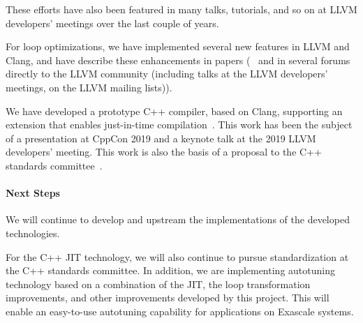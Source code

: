 These efforts have also been featured in many talks, tutorials, and so on at LLVM developers' meetings over the last couple of years.

For loop optimizations, we have implemented several new features in LLVM and Clang, and have describe these enhancements in papers (~\cite{kruse2018user,kruse2018loop} and in several forums directly to the LLVM community (including talks at the LLVM developers' meetings, on the LLVM mailing lists)).

We have developed a prototype C++ compiler, based on Clang, supporting an extension that enables just-in-time compilation~\cite{finkel2019clangjit}. This work has been the subject of a presentation at CppCon 2019 and a keynote talk at the 2019 LLVM developers' meeting. This work is also the basis of a proposal to the C++ standards committee~\cite{P1609R0}.

\paragraph{Next Steps}
We will continue to develop and upstream the implementations of the developed technologies.

For the C++ JIT technology, we will also continue to pursue standardization at the C++ standards committee. In addition, we are implementing autotuning technology based on a combination of the JIT, the loop transformation improvements, and other improvements developed by this project. This will enable an easy-to-use autotuning capability for applications on Exascale systems.


%
